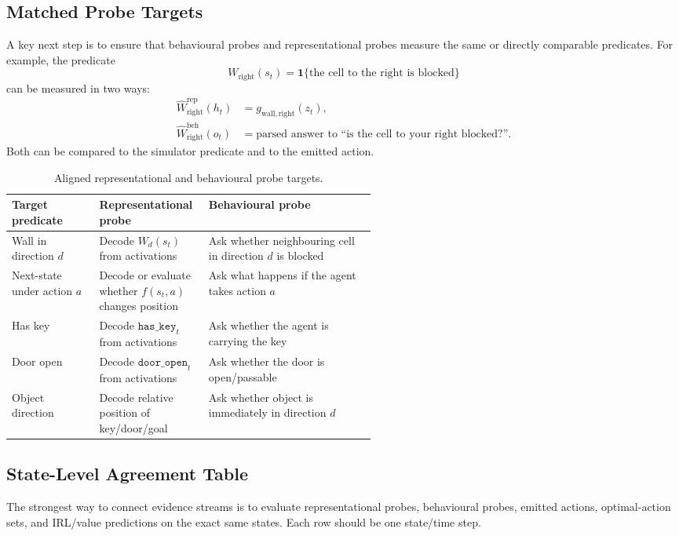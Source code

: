 \documentclass[11pt,a4paper]{article}
\newcommand{\ind}[1]{\mathbf{1}\{#1\}}
\begin{document}
\subsection{Matched Probe Targets}

A key next step is to ensure that behavioural probes and representational probes measure the same or directly comparable predicates. For example, the predicate
\[
W_{\mathrm{right}}(s_t)=\ind{\text{the cell to the right is blocked}}
\]
can be measured in two ways:
\begin{align*}
\hat W^{\mathrm{rep}}_{\mathrm{right}}(h_t)&=g_{\mathrm{wall,right}}(z_t),\\
\hat W^{\mathrm{beh}}_{\mathrm{right}}(o_t)&=\text{parsed answer to ``is the cell to your right blocked?''}.
\end{align*}
Both can be compared to the simulator predicate and to the emitted action.

\begin{table}[h]
\centering
\small
\begin{tabularx}{\linewidth}{p{0.24\linewidth}p{0.30\linewidth}X}
\toprule
Target predicate & Representational probe & Behavioural probe \\
\midrule
Wall in direction $d$ & Decode $W_d(s_t)$ from activations & Ask whether neighbouring cell in direction $d$ is blocked \\
Next-state under action $a$ & Decode or evaluate whether $f(s_t,a)$ changes position & Ask what happens if the agent takes action $a$ \\
Has key & Decode $\texttt{has\_key}_t$ from activations & Ask whether the agent is carrying the key \\
Door open & Decode $\texttt{door\_open}_t$ from activations & Ask whether the door is open/passable \\
Object direction & Decode relative position of key/door/goal & Ask whether object is immediately in direction $d$ \\
\bottomrule
\end{tabularx}
\caption{Aligned representational and behavioural probe targets.}
\label{tab:aligned-probe-targets}
\end{table}

\subsection{State-Level Agreement Table}

The strongest way to connect evidence streams is to evaluate representational probes, behavioural probes, emitted actions, optimal-action sets, and IRL/value predictions on the exact same states. Each row should be one state/time step.
\end{document}
